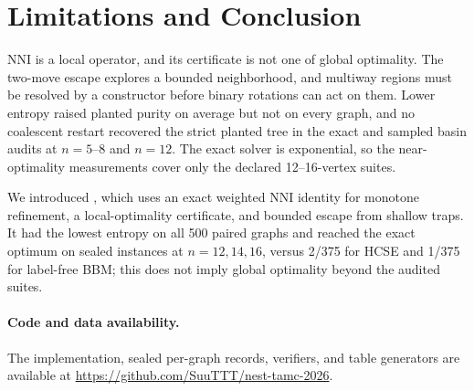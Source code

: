 \section{Limitations and Conclusion}
NNI is a local operator, and its certificate is not one of global optimality.
The two-move escape explores a bounded neighborhood, and multiway regions must
be resolved by a constructor before binary rotations can act on them. Lower
entropy raised planted purity on average but not on every graph, and no
coalescent restart recovered the strict planted tree in the exact and sampled
basin audits at $n=5$--$8$ and $n=12$. The exact solver is exponential, so the
near-optimality measurements cover only the declared 12--16-vertex suites.

We introduced \NEST, which uses an exact weighted NNI identity for monotone
refinement, a local-optimality certificate, and bounded escape from shallow
traps. It had the lowest entropy on all 500 paired graphs and reached the
exact optimum on \ScaleCombinedExact{} sealed instances at $n=12,14,16$,
versus 2/375 for HCSE and 1/375 for label-free BBM; this does not imply
global optimality beyond the audited suites.

\paragraph{Code and data availability.}
The implementation, sealed per-graph records, verifiers, and table generators
are available at \url{https://github.com/SuuTTT/nest-tamc-2026}.
